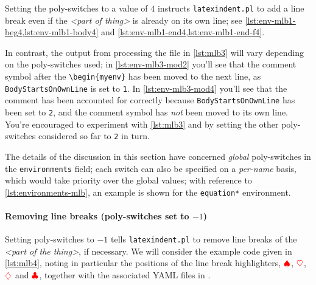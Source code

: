 		\begin{minipage}{.45\linewidth}
		\end{minipage}
		\hfill
		\begin{minipage}{.45\linewidth}
		\end{minipage}

		Setting the poly-switches to a value of $4$ instructs \texttt{latexindent.pl} to add a
		line break even if the \emph{<part of thing>} is already on its own line; see
		\cref{lst:env-mlb1-beg4,lst:env-mlb1-body4} and
		\cref{lst:env-mlb1-end4,lst:env-mlb1-end-f4}.

		In contrast, the output from processing the file in \cref{lst:mlb3} will vary depending
		on the poly-switches used; in \cref{lst:env-mlb3-mod2} you'll see that the comment symbol
		after the \lstinline!\begin{myenv}! has been moved to the next line, as
		\texttt{BodyStartsOnOwnLine} is set to \texttt{1}. In \cref{lst:env-mlb3-mod4} you'll see
		that the comment has been accounted for correctly because \texttt{BodyStartsOnOwnLine}
		has been set to \texttt{2}, and the comment symbol has \emph{not} been moved to its own
		line. You're encouraged to experiment with \cref{lst:mlb3} and by setting the other
		poly-switches considered so far to \texttt{2} in turn.

		\begin{cmhtcbraster}[raster column skip=.1\linewidth]
		\end{cmhtcbraster}

		The details of the discussion in this section have concerned \emph{global} poly-switches
		in the \texttt{environments} field; each switch can also be specified on a
		\emph{per-name} basis, which would take priority over the global values; with reference
		to \vref{lst:environments-mlb}, an example is shown for the \texttt{equation*}
		environment.

	\paragraph{Removing line breaks (poly-switches set to $-1$)}
		Setting poly-switches to $-1$ tells \texttt{latexindent.pl} to remove line breaks of the
		\emph{<part of the thing>}, if necessary. We will consider the example code given in
		\cref{lst:mlb4}, noting in particular the positions of the line break highlighters,
		$\color{red}\spadesuit$, $\color{red}\heartsuit$, $\color{red}\diamondsuit$ and
		$\color{red}\clubsuit$, together with the associated YAML files in
		. 

